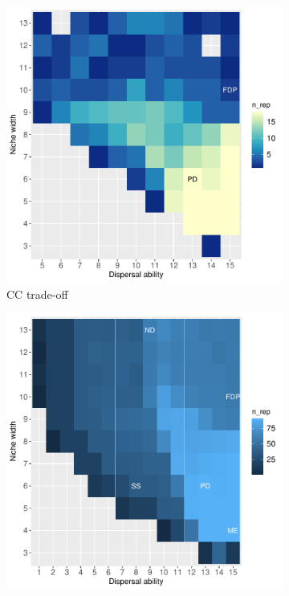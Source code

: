 \begin{figure}\ContinuedFloat
	\centering
	\begin{subfigure}[b]{0.45\linewidth}
		\includegraphics[width=\linewidth]{./figures/Parameter_space_overlook_CC_tradeoff.pdf}
		\caption{CC trade-off}
		\label{fig:para-CC}
	\end{subfigure}
	\begin{subfigure}[b]{0.45\linewidth}
		\includegraphics[width=\linewidth]{./figures/Parameter_space_overlook_archetypes.pdf}

\end{subfigure}
\end{figure}
